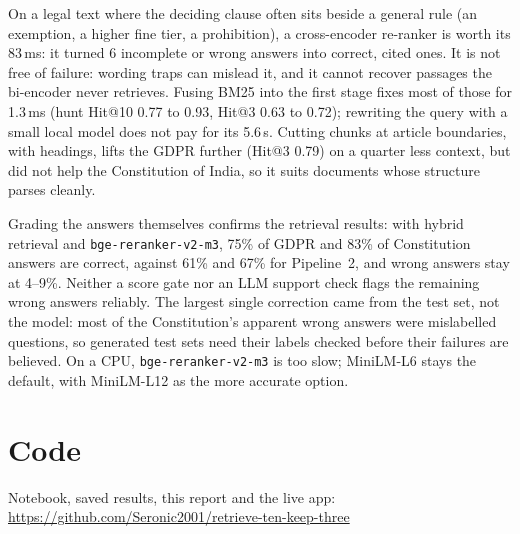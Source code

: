 \documentclass[10pt,a4paper]{article}
\begin{document}
On a legal text where the deciding clause often sits beside a general rule (an exemption, a higher fine tier, a
prohibition), a cross-encoder re-ranker is worth its 83\,ms: it turned 6 incomplete or wrong answers into correct,
cited ones. It is not free of failure: wording traps can mislead it, and it cannot recover passages the bi-encoder
never retrieves. Fusing BM25 into the first stage fixes most of those for 1.3\,ms (hunt Hit@10 0.77 to 0.93, Hit@3
0.63 to 0.72); rewriting the query with a small local model does not pay for its 5.6\,s. Cutting chunks at
article boundaries, with headings, lifts the GDPR further (Hit@3 0.79) on a quarter less context, but did not help
the Constitution of India, so it suits documents whose structure parses cleanly.

Grading the answers themselves confirms the retrieval results: with hybrid retrieval and
\texttt{bge-reranker-v2-m3}, 75\% of GDPR and 83\% of Constitution answers are correct, against 61\% and 67\% for
Pipeline~2, and wrong answers stay at 4--9\%. Neither a score gate nor an LLM support check flags the remaining
wrong answers reliably. The largest single correction came from the test set, not the model: most of the
Constitution's apparent wrong answers were mislabelled questions, so generated test sets need their labels checked
before their failures are believed. On a CPU, \texttt{bge-reranker-v2-m3} is too slow; MiniLM-L6 stays the default,
with MiniLM-L12 as the more accurate option.

\section*{Code}

Notebook, saved results, this report and the live app:\\
\url{https://github.com/Seronic2001/retrieve-ten-keep-three}
\end{document}
